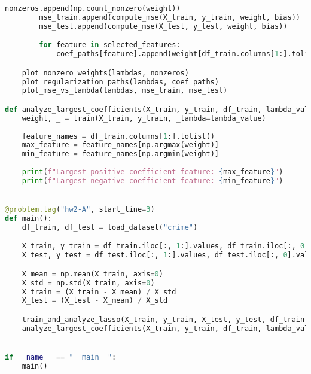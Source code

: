 \documentclass{article}
\begin{document}
\begin{lstlisting}[language=Python]
        nonzeros.append(np.count_nonzero(weight))
        mse_train.append(compute_mse(X_train, y_train, weight, bias))
        mse_test.append(compute_mse(X_test, y_test, weight, bias))

        for feature in selected_features:
            coef_paths[feature].append(weight[df_train.columns[1:].tolist().index(feature)])

    plot_nonzero_weights(lambdas, nonzeros)
    plot_regularization_paths(lambdas, coef_paths)
    plot_mse_vs_lambda(lambdas, mse_train, mse_test)

def analyze_largest_coefficients(X_train, y_train, df_train, lambda_value=30):
    weight, _ = train(X_train, y_train, _lambda=lambda_value)
    
    feature_names = df_train.columns[1:].tolist()
    max_feature = feature_names[np.argmax(weight)]
    min_feature = feature_names[np.argmin(weight)]
    
    print(f"Largest positive coefficient feature: {max_feature}")
    print(f"Largest negative coefficient feature: {min_feature}")


@problem.tag("hw2-A", start_line=3)
def main():
    df_train, df_test = load_dataset("crime")

    X_train, y_train = df_train.iloc[:, 1:].values, df_train.iloc[:, 0].values
    X_test, y_test = df_test.iloc[:, 1:].values, df_test.iloc[:, 0].values

    X_mean = np.mean(X_train, axis=0)
    X_std = np.std(X_train, axis=0)
    X_train = (X_train - X_mean) / X_std
    X_test = (X_test - X_mean) / X_std  

    train_and_analyze_lasso(X_train, y_train, X_test, y_test, df_train)
    analyze_largest_coefficients(X_train, y_train, df_train, lambda_value=30)


if __name__ == "__main__":
    main()

\end{lstlisting}
\end{document}
